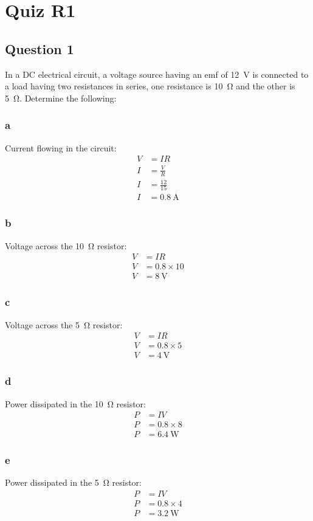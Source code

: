 \chapter{Quiz R1}
\section{Question 1}
In a DC electrical circuit, a voltage source having an emf of \SI{12}{\volt} is connected to a load having two resistances in series, one resistance is \SI{10}{\ohm} and the other is \SI{5}{\ohm}. Determine the following:
\subsection{a}
Current flowing in the circuit:
\begin{align}
    V & = IR                \\
    I & = \frac{V}{R}       \\
    I & = \frac{12}{15}     \\
    I & = \SI{0.8}{\ampere}
\end{align}
\subsection{b}
Voltage across the \SI{10}{\ohm} resistor:
\begin{align}
    V & = IR            \\
    V & = 0.8\times 10  \\
    V & = \SI{8}{\volt}
\end{align}
\subsection{c}
Voltage across the \SI{5}{\ohm} resistor:
\begin{align}
    V & = IR            \\
    V & = 0.8\times 5   \\
    V & = \SI{4}{\volt}
\end{align}
\subsection{d}
Power dissipated in the \SI{10}{\ohm} resistor:
\begin{align}
    P & = IV              \\
    P & = 0.8\times 8     \\
    P & = \SI{6.4}{\watt}
\end{align}
\subsection{e}
Power dissipated in the \SI{5}{\ohm} resistor:
\begin{align}
    P & = IV              \\
    P & = 0.8\times 4     \\
    P & = \SI{3.2}{\watt}
\end{align}
